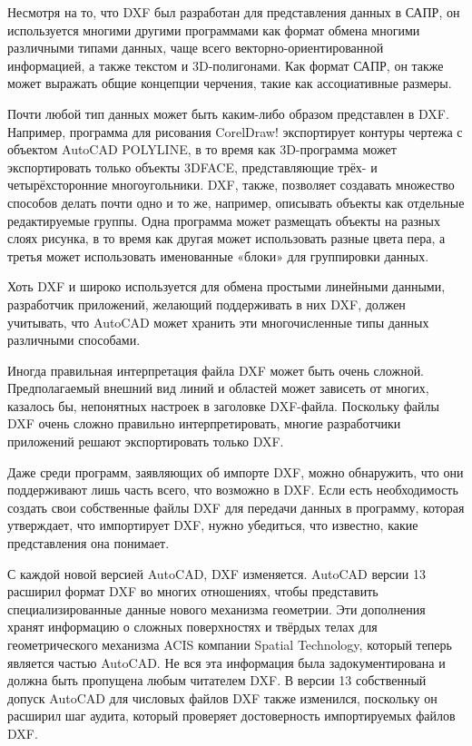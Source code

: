 Несмотря на то, что DXF был разработан для представления данных в САПР, он используется многими другими программами как формат обмена многими различными типами данных, чаще всего векторно-ориентированной информацией, а также текстом и 3D-полигонами. Как формат САПР, он также может выражать общие концепции черчения, такие как ассоциативные размеры.

Почти любой тип данных может быть каким-либо образом представлен в DXF. Например, программа для рисования CorelDraw! экспортирует контуры чертежа с объектом AutoCAD POLYLINE, в то время как 3D-программа может экспортировать только объекты 3DFACE, представляющие трёх- и четырёхсторонние многоугольники. DXF, также, позволяет создавать множество способов делать почти одно и то же, например, описывать объекты как отдельные редактируемые группы. Одна программа может размещать объекты на разных слоях рисунка, в то время как другая может использовать разные цвета пера, а третья может использовать именованные «блоки» для группировки данных.

Хоть DXF и широко используется для обмена простыми линейными данными, разработчик приложений, желающий поддерживать в них DXF, должен учитывать, что AutoCAD может хранить эти многочисленные типы данных различными способами.

Иногда правильная интерпретация файла DXF может быть очень сложной. Предполагаемый внешний вид линий и областей может зависеть от многих, казалось бы, непонятных настроек в заголовке DXF-файла. Поскольку файлы DXF очень сложно правильно интерпретировать, многие разработчики приложений решают экспортировать только DXF.

Даже среди программ, заявляющих об импорте DXF, можно обнаружить, что они поддерживают лишь часть всего, что возможно в DXF. Если есть необходимость создать свои собственные файлы DXF для передачи данных в программу, которая утверждает, что импортирует DXF, нужно убедиться, что известно, какие представления она понимает.

С каждой новой версией AutoCAD, DXF изменяется. AutoCAD версии 13 расширил формат DXF во многих отношениях, чтобы представить специализированные данные нового механизма геометрии. Эти дополнения хранят информацию о сложных поверхностях и твёрдых телах для геометрического механизма ACIS компании Spatial Technology, который теперь является частью AutoCAD. Не вся эта информация была задокументирована и должна быть пропущена любым читателем DXF. В версии 13 собственный допуск AutoCAD для числовых файлов DXF также изменился, поскольку он расширил шаг аудита, который проверяет достоверность импортируемых файлов DXF.

